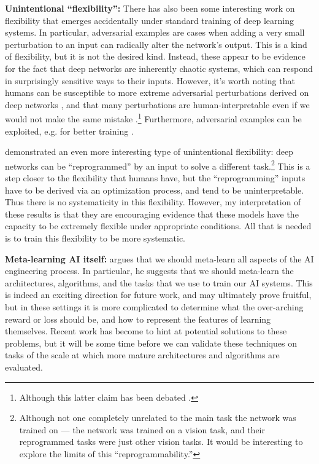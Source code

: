 \textbf{Unintentional ``flexibility'':} There has also been some interesting work on flexibility that emerges accidentally under standard training of deep learning systems. In particular, adversarial examples \citep{SzegedyAdv} are cases when adding a very small perturbation to an input can radically alter the network's output. This is a kind of flexibility, but it is not the desired kind. Instead, these appear to be evidence for the fact that deep networks are inherently chaotic systems, which can respond in surprisingly sensitive ways to their inputs. However, it's worth noting that humans can be susceptible to more extreme adversarial perturbations derived on deep networks \citep{Elsayed2018}, and that many perturbations are human-interpretable even if we would not make the same mistake \citep{Zhou2019}.\footnote{Although this latter claim has been debated \citep{Dujmovic2020}.} Furthermore, adversarial examples can be exploited, e.g. for better training \citep{Goodfellow2015}. \par 
\citet{Elsayed} demonstrated an even more interesting type of unintentional flexibility: deep networks can be ``reprogrammed'' by an input to solve a different task.\footnote{Although not one completely unrelated to the main task the network was trained on --- the network was trained on a vision task, and their reprogrammed tasks were just other vision tasks. It would be interesting to explore the limits of this ``reprogrammability.''} This is a step closer to the flexibility that humans have, but the ``reprogramming'' inputs have to be derived via an optimization process, and tend to be uninterpretable. Thus there is no systematicity in this flexibility. However, my interpretation of these results is that they are encouraging evidence that these models have the capacity to be extremely flexible under appropriate conditions. All that is needed is to train this flexibility to be more systematic. \par  

\textbf{Meta-learning AI itself:} \citet{Clune2019} argues that we should meta-learn all aspects of the AI engineering process. In particular, he suggests that we should meta-learn the architectures, algorithms, and the tasks that we use to train our AI systems. This is indeed an exciting direction for future work, and may ultimately prove fruitful, but in these settings it is more complicated to determine what the over-arching reward or loss should be, and how to represent the features of learning themselves. Recent work has become to hint at potential solutions to these problems, but it will be some time before we can validate these techniques on tasks of the scale at which more mature architectures and algorithms are evaluated. \par 

